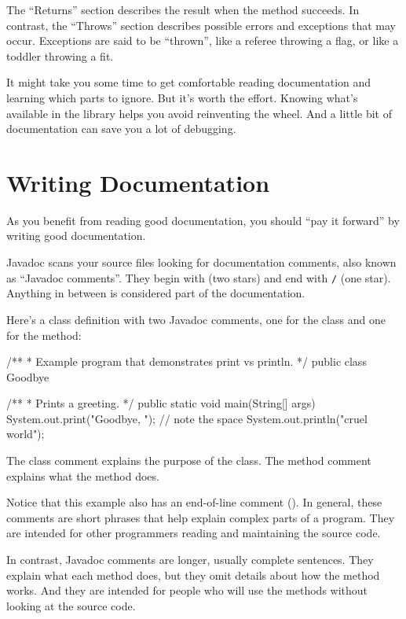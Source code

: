 The ``Returns'' section describes the result when the method succeeds.
In contrast, the ``Throws'' section describes possible errors and exceptions that may occur.
Exceptions are said to be ``thrown'', like a referee throwing a flag, or like a toddler throwing a fit.

It might take you some time to get comfortable reading documentation and learning which parts to ignore.
But it's worth the effort.
Knowing what's available in the library helps you avoid reinventing the wheel.
And a little bit of documentation can save you a lot of debugging.


\section{Writing Documentation}

As you benefit from reading good documentation, you should ``pay it forward'' by writing good documentation.


Javadoc scans your source files looking for documentation comments, also known as ``Javadoc comments''.
They begin with \java{/**} (two stars) and end with \textcolor{comment}{\tt */} (one star).
Anything in between is considered part of the documentation.

Here's a class definition with two Javadoc comments, one for the  class and one for the  method:

\begin{code}
/**
 * Example program that demonstrates print vs println.
 */
public class Goodbye {

    /**
     * Prints a greeting.
     */
    public static void main(String[] args) {
        System.out.print("Goodbye, ");  // note the space
        System.out.println("cruel world");
    }
}
\end{code}

The class comment explains the purpose of the class.
The method comment explains what the method does.

Notice that this example also has an end-of-line comment (\java{//}).
In general, these comments are short phrases that help explain complex parts of a program.
They are intended for other programmers reading and maintaining the source code.

In contrast, Javadoc comments are longer, usually complete sentences.
They explain what each method does, but they omit details about how the method works.
And they are intended for people who will use the methods without looking at the source code.


